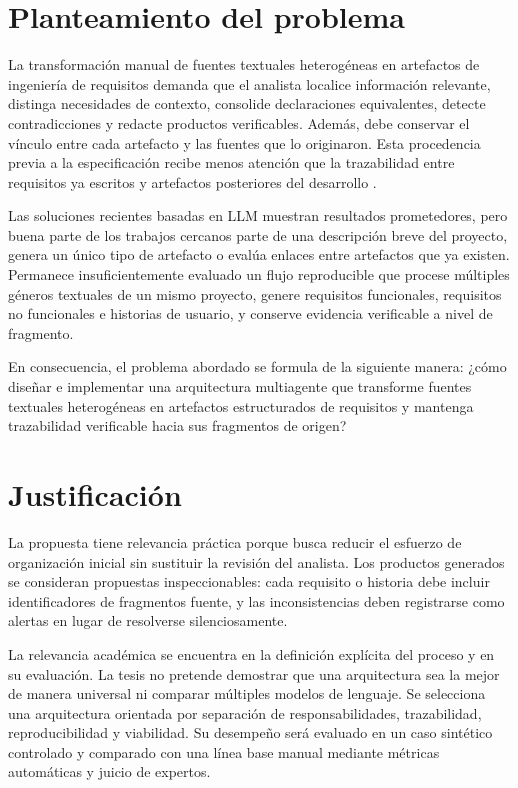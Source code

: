 \section{Planteamiento del problema}

La transformación manual de fuentes textuales heterogéneas en artefactos de ingeniería de requisitos demanda que el analista localice información relevante, distinga necesidades de contexto, consolide declaraciones equivalentes, detecte contradicciones y redacte productos verificables. Además, debe conservar el vínculo entre cada artefacto y las fuentes que lo originaron. Esta procedencia previa a la especificación recibe menos atención que la trazabilidad entre requisitos ya escritos y artefactos posteriores del desarrollo \cite{mucha2024}.

Las soluciones recientes basadas en LLM muestran resultados prometedores, pero buena parte de los trabajos cercanos parte de una descripción breve del proyecto, genera un único tipo de artefacto o evalúa enlaces entre artefactos que ya existen. Permanece insuficientemente evaluado un flujo reproducible que procese múltiples géneros textuales de un mismo proyecto, genere requisitos funcionales, requisitos no funcionales e historias de usuario, y conserve evidencia verificable a nivel de fragmento.

En consecuencia, el problema abordado se formula de la siguiente manera: ¿cómo diseñar e implementar una arquitectura multiagente que transforme fuentes textuales heterogéneas en artefactos estructurados de requisitos y mantenga trazabilidad verificable hacia sus fragmentos de origen?

\section{Justificación}

La propuesta tiene relevancia práctica porque busca reducir el esfuerzo de organización inicial sin sustituir la revisión del analista. Los productos generados se consideran propuestas inspeccionables: cada requisito o historia debe incluir identificadores de fragmentos fuente, y las inconsistencias deben registrarse como alertas en lugar de resolverse silenciosamente.

La relevancia académica se encuentra en la definición explícita del proceso y en su evaluación. La tesis no pretende demostrar que una arquitectura sea la mejor de manera universal ni comparar múltiples modelos de lenguaje. Se selecciona una arquitectura orientada por separación de responsabilidades, trazabilidad, reproducibilidad y viabilidad. Su desempeño será evaluado en un caso sintético controlado y comparado con una línea base manual mediante métricas automáticas y juicio de expertos.

